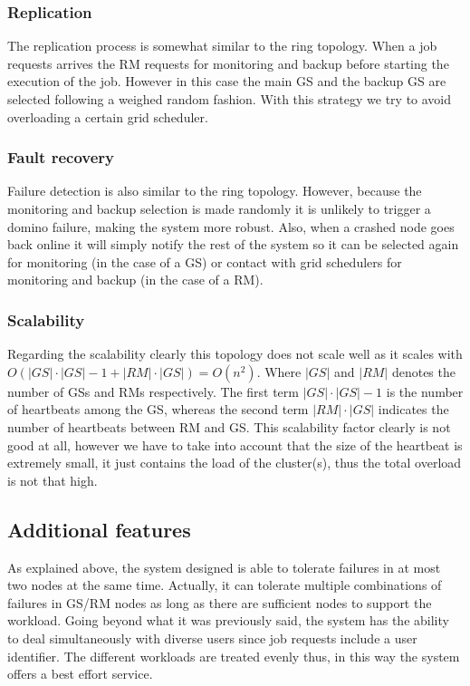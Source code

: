 \subsubsection{Replication}

The replication process is somewhat similar to the ring topology. When a job requests arrives the RM requests for monitoring and backup before starting the execution of the job. However in this case the main GS and the backup GS are selected following a weighed random fashion. With this strategy we try to avoid overloading a certain grid scheduler.

\subsubsection{Fault recovery}

Failure detection is also similar to the ring topology. However, because the monitoring and backup selection is made randomly it is unlikely to trigger a domino failure, making the system more robust. Also, when a crashed node goes back online it will simply notify the rest of the system so it can be selected again for monitoring (in the case of a GS) or contact with grid schedulers for monitoring and backup (in the case of a RM). 

\subsubsection{Scalability}
Regarding the scalability clearly this topology does not scale well as it scales with $O(|GS|\cdot |GS|-1 + |RM|\cdot |GS|) = O(n^2)$. Where $|GS|$ and $|RM|$ denotes the number of GSs and RMs respectively. The first term $|GS|\cdot |GS|-1$ is the number of heartbeats among the GS, whereas the second term $|RM|\cdot |GS|$ indicates the number of heartbeats between RM and GS. This scalability factor clearly is not good at all, however we have to take into account that the size of the heartbeat is extremely small, it just contains the load of the cluster(s), thus the total overload is not that high.

\subsection{Additional features}

As explained above, the system designed is able to tolerate failures in at most two nodes at the same time. Actually, it can tolerate multiple combinations of failures in GS/RM nodes as long as there are sufficient nodes to support the workload. Going beyond what it was previously said, the system has the ability to deal simultaneously with diverse users since job requests include a user identifier. The different workloads are treated evenly thus, in this way the system offers a best effort service.